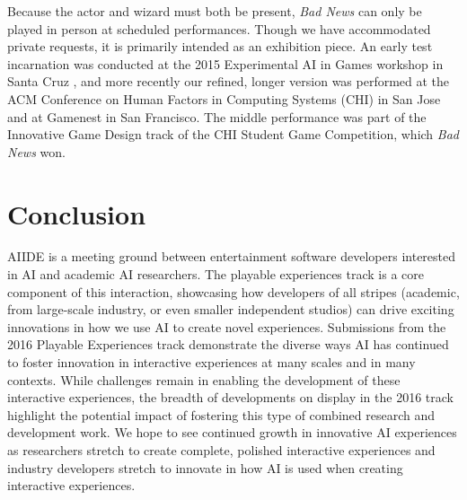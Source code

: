 \documentclass[letterpaper]{article}
\begin{document}
Because the actor and wizard must both be present, \textit{Bad News} can only be played in person at scheduled performances.
Though we have accommodated private requests, it is primarily intended as an exhibition piece.
An early test incarnation was conducted at the 2015 Experimental AI in Games workshop in Santa Cruz \cite{ryan2015bad}, and more recently our refined, longer version was performed at the ACM Conference on Human Factors in Computing Systems (CHI) in San Jose \cite{ryan2016bad} and at Gamenest in San Francisco.
The middle performance was part of the Innovative Game Design track of the CHI Student Game Competition, which \textit{Bad News} won.




\section{Conclusion}

AIIDE is a meeting ground between entertainment software developers interested in AI and academic AI researchers.
The playable experiences track is a core component of this interaction, showcasing how developers of all stripes (academic, from large-scale industry, or even smaller independent studios) can drive exciting innovations in how we use AI to create novel experiences.
Submissions from the 2016 Playable Experiences track demonstrate the diverse ways AI has continued to foster innovation in interactive experiences at many scales and in many contexts.
While challenges remain in enabling the development of these interactive experiences, the breadth of developments on display in the 2016 track highlight the potential impact of fostering this type of combined research and development work.
We hope to see continued growth in innovative AI experiences as researchers stretch to create complete, polished interactive experiences and industry developers stretch to innovate in how AI is used when creating interactive experiences.








\end{document}
